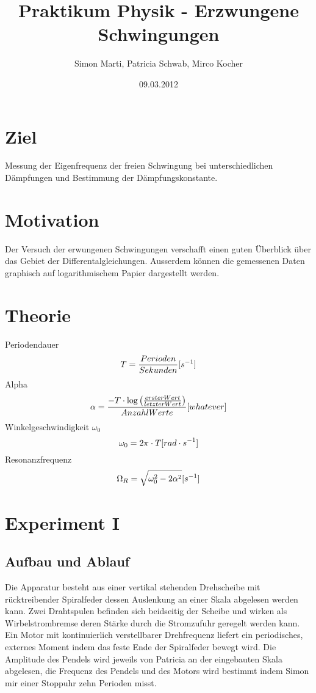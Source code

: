 \documentclass[12pt,a4paper]{article}
\title{Praktikum Physik - Erzwungene Schwingungen}
\author{Simon Marti, Patricia Schwab, Mirco Kocher}
\date{09.03.2012}
\begin{document}
\maketitle

\section*{Ziel}
Messung der Eigenfrequenz der freien Schwingung bei unterschiedlichen D\"ampfungen und Bestimmung der D\"ampfungskonstante.

\section*{Motivation}
Der Versuch der erwungenen Schwingungen verschafft einen guten \"Uberblick \"uber das Gebiet der Differentalgleichungen. Ausserdem k\"onnen die gemessenen Daten graphisch auf logarithmischem Papier dargestellt werden. 

\section*{Theorie}
Periodendauer
\begin{equation}
T = \frac{Perioden}{Sekunden} \mbox [{s}^{-1}]
\end{equation}
Alpha
\begin{equation}
\alpha = \frac{-T\cdot\log\left( \frac{erster Wert}{letzter Wert}\right)}{Anzahl Werte} \mbox [{whatever}]
\end{equation}
Winkelgeschwindigkeit $\omega_0$
\begin{equation}
\omega_0 = 2\pi \cdot T \mbox[{rad \cdot s}^{-1}]
\end{equation}
Resonanzfrequenz
\begin{equation}
\Omega_R = \sqrt{\omega_0^2 - 2\alpha^2} \mbox [{s}^{-1}]
\end{equation}

\newpage

\section*{Experiment I}

\subsection*{Aufbau und Ablauf}
Die Apparatur besteht aus einer vertikal stehenden Drehscheibe mit r\"ucktreibender Spiralfeder dessen Auslenkung an einer Skala abgelesen werden kann. Zwei Drahtspulen befinden sich beidseitig der Scheibe und wirken als Wirbelstrombremse deren St\"arke durch die Stromzufuhr geregelt werden kann. Ein Motor mit kontinuierlich verstellbarer Drehfrequenz liefert ein periodisches, externes Moment indem das feste Ende der Spiralfeder bewegt wird. Die Amplitude des Pendels wird jeweils von Patricia an der eingebauten Skala abgelesen, die Frequenz des Pendels und des Motors wird bestimmt indem Simon mir einer Stoppuhr zehn Perioden misst.
\end{document}
